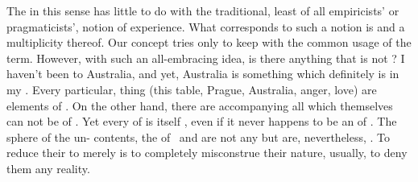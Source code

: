 

\pa The  in this sense has little to do with the traditional,
least of all empiricists' or pragmaticists', notion of experience. What
corresponds to such a notion is  and a multiplicity thereof.
Our concept tries only to keep with the common usage of the term.  However, with
such an all-embracing idea, is there anything that is not ? I
haven't been to Australia, and yet, Australia is something which definitely is
 in my . Every particular, 
thing (this table, Prague, Australia, anger, love) are elements of
. On the other hand, there are
 accompanying all  which themselves can not be
 of . Yet every  of 
is itself , even if it never happens to be an  of
. The sphere of the un- contents, the 
of \pexp\ and  are not any  but are,
nevertheless, . To reduce their  to merely
 is to completely misconstrue their nature, usually, to
deny them any reality.

